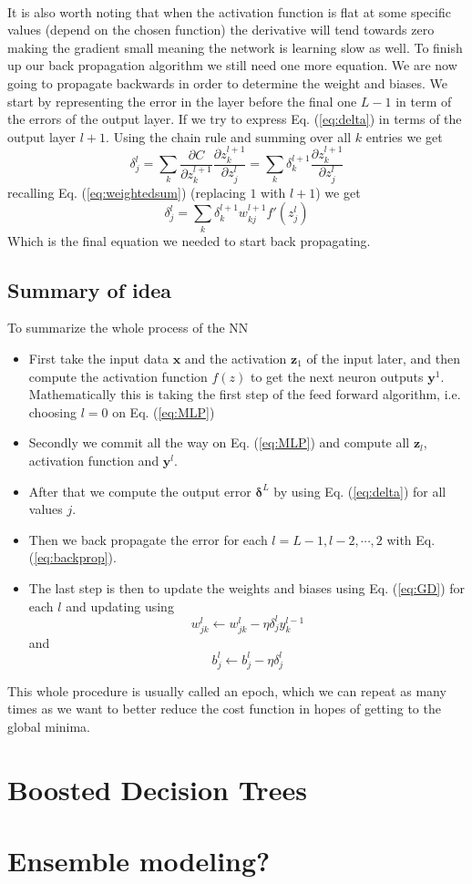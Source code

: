 \documentclass[14pt, a4paper]{book}
\begin{document}
\\It is also worth noting that when the activation function is flat at some specific values (depend on the chosen function) the derivative will tend towards zero making the gradient small meaning the network is learning slow as well. To finish up our back propagation algorithm we still need one more equation. We are now going to propagate backwards in order to determine the weight and biases. We start by representing the error in the layer before the final one $L-1$ in term of the errors of the output layer. If we try to express Eq. (\ref{eq:delta}) in terms of the output layer $l+1$. Using the chain rule and summing over all $k$ entries we get
$$
\delta_j^l=\sum_k\frac{\partial C}{\partial z_k^{l+1}}\frac{\partial z_k^{l+1}}{\partial z_j^l} =\sum_k \delta_k^{l+1}\frac{\partial z_k^{l+1}}{\partial z_j^l}
$$
recalling Eq. (\ref{eq:weightedsum}) (replacing $1$ with $l+1$) we get
\begin{equation}\label{eq:backprop}
    \delta_j^l=\sum_k\delta_k^{l+1}w_{kj}^{l+1}f'(z_j^l)
\end{equation}
Which is the final equation we needed to start back propagating. 

\subsection{Summary of idea}
To summarize the whole process of the NN
\begin{itemize}
    \item First take the input data $\mathbf{x}$ and the activation $\mathbf{z}_1$ of the input later, and then compute the activation function $f(z)$ to get the next neuron outputs $\mathbf{y}^1$. Mathematically this is taking the first step of the feed forward algorithm, i.e. choosing $l=0$ on Eq. (\ref{eq:MLP})
    \item Secondly we commit all the way on Eq. (\ref{eq:MLP}) and compute all $\mathbf{z}_l$, activation function and $\mathbf{y}^l$.
    \item After that we compute the output error $\bm{\delta}^L$ by using Eq. (\ref{eq:delta}) for all values $j$.
    \item Then we back propagate the error for each $l=L-1,l-2,\cdots,2$ with Eq. (\ref{eq:backprop}).
    \item The last step is then to update the weights and biases using Eq. (\ref{eq:GD}) for each $l$ and updating using
    $$
    w_{jk}^l\leftarrow w_{jk}^l-\eta\delta_j^ly_k^{l-1}
    $$
    and
    $$
    b_j^l \leftarrow b_j^l-\eta\delta_j^l
    $$
\end{itemize}
This whole procedure is usually called an epoch, which we can repeat as many times as we want to better reduce the cost function in hopes of getting to the global minima.

\section{Boosted Decision Trees}

\section{Ensemble modeling?}
\end{document}
